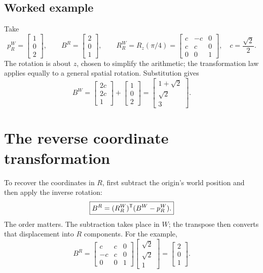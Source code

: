 \subsection{Worked example}
Take
\[
 p_R^W=\begin{bmatrix}1\\0\\2\end{bmatrix},\qquad
 B^R=\begin{bmatrix}2\\0\\1\end{bmatrix},\qquad
 R_R^W=R_z(\pi/4)=\begin{bmatrix}c&-c&0\\c&c&0\\0&0&1\end{bmatrix},
 \quad c=\frac{\sqrt2}{2}.
\]
The rotation is about $z$, chosen to simplify the arithmetic; the transformation
law applies equally to a general spatial rotation. Substitution gives
\begin{equation}
 B^W=\begin{bmatrix}2c\\2c\\1\end{bmatrix}
      +\begin{bmatrix}1\\0\\2\end{bmatrix}
     =\begin{bmatrix}1+\sqrt2\\\sqrt2\\3\end{bmatrix}.
 \label{eq:l05-example}
\end{equation}

\section{The reverse coordinate transformation}
To recover the coordinates in $R$, first subtract the origin's world position
and then apply the inverse rotation:
\begin{equation}
 \boxed{B^R=(R_R^W)^{\mathsf T}(B^W-p_R^W).}
 \label{eq:l05-reverse}
\end{equation}
The order matters. The subtraction takes place in $W$; the transpose then
converts that displacement into $R$ components. For the example,
\[
 B^R=\begin{bmatrix}c&c&0\\-c&c&0\\0&0&1\end{bmatrix}
 \begin{bmatrix}\sqrt2\\\sqrt2\\1\end{bmatrix}
 =\begin{bmatrix}2\\0\\1\end{bmatrix}.
\]

